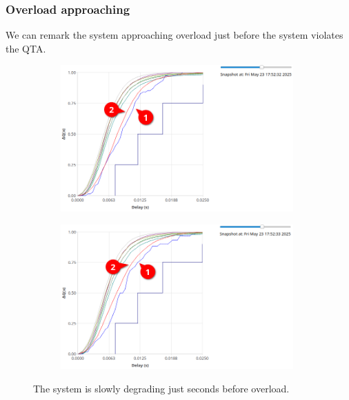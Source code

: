         \subsubsection{Overload approaching}
            We can remark the system approaching overload just before the system violates the QTA.
        \begin{figure}[H]
            \centering
            \begin{subfigure}{.5\textwidth}
                \centering
                \includegraphics[width=0.98\textwidth]{img/early_sign2.png}
                \label{fig:appr_ov_2}
            \end{subfigure}%
            \begin{subfigure}{.5\textwidth}
                \centering
                \includegraphics[width =0.98\textwidth]{img/approaching_2.png}
                \label{fig:appr_ov}
            \end{subfigure}
            \label{fig:appr_ov_t}
            \caption{The system is slowly degrading just seconds before overload.}
            \end{figure}
        
